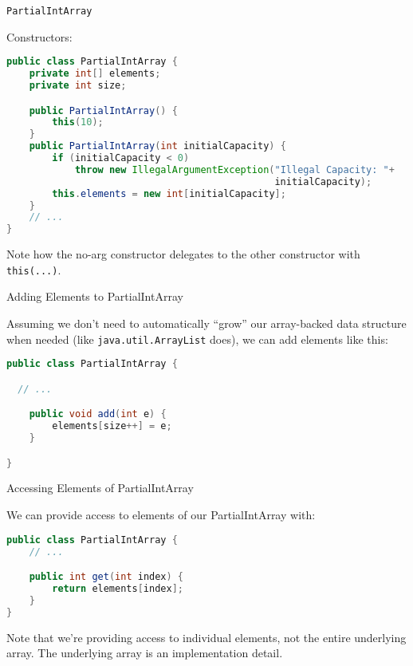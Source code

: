 \documentclass{beamer}
\begin{document}
\begin{frame}[fragile]{{\tt PartialIntArray}}


Constructors:
\begin{lstlisting}[language=Java]
public class PartialIntArray {
    private int[] elements;
    private int size;

    public PartialIntArray() {
        this(10);
    }
    public PartialIntArray(int initialCapacity) {
        if (initialCapacity < 0)
            throw new IllegalArgumentException("Illegal Capacity: "+
                                               initialCapacity);
        this.elements = new int[initialCapacity];
    }
    // ...
}
\end{lstlisting}
Note how the no-arg constructor delegates to the other constructor with {\tt this(...)}.
\end{frame}

\begin{frame}[fragile]{Adding Elements to PartialIntArray}


Assuming we don't need to automatically ``grow'' our array-backed data structure when needed (like {\tt java.util.ArrayList} does), we can add elements like this:

\begin{lstlisting}[language=Java]
public class PartialIntArray {

  // ...

    public void add(int e) {
        elements[size++] = e;
    }

}
\end{lstlisting}

\end{frame}

\begin{frame}[fragile]{Accessing Elements of PartialIntArray}


We can provide access to elements of our PartialIntArray with:

\begin{lstlisting}[language=Java]
public class PartialIntArray {
    // ...

    public int get(int index) {
        return elements[index];
    }
}
\end{lstlisting}

Note that we're providing access to individual elements, not the entire underlying array.  The underlying array is an implementation detail.
\end{frame}
\end{document}
